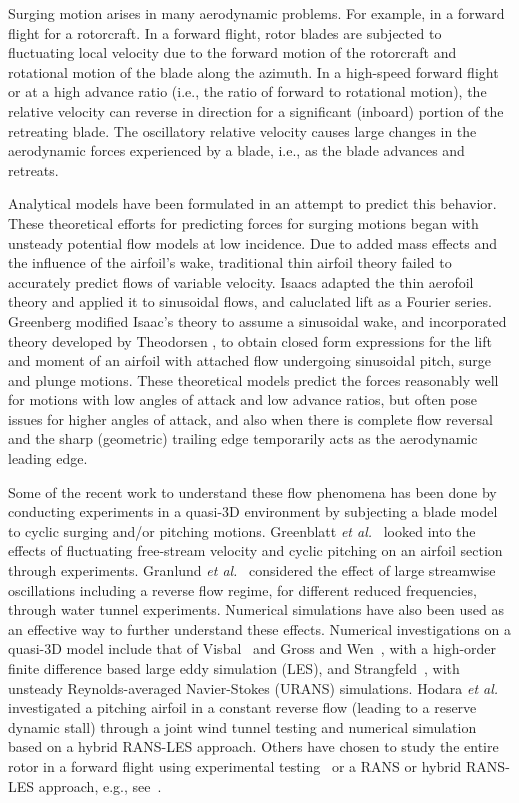 Surging motion arises in many aerodynamic problems.
For example, in a forward flight for a rotorcraft.
In a forward flight, rotor blades are subjected to fluctuating local velocity due to the forward motion of the rotorcraft 
and rotational motion of the blade along the azimuth. 
In a high-speed forward flight or at a high advance ratio (i.e., the ratio of forward to rotational motion), the relative velocity 
can reverse in direction for a significant (inboard) portion of the retreating blade.
The oscillatory relative velocity causes large changes in the aerodynamic forces experienced by a blade, i.e., as the blade advances and retreats. 

Analytical models have been formulated in an attempt to predict this behavior. These theoretical efforts for predicting forces for surging motions began with unsteady potential flow models at low incidence. 
Due to added mass effects and the influence of the airfoil’s wake, traditional thin airfoil theory failed to accurately predict flows of variable velocity. 
Isaacs \cite{bib:Isaacs} adapted the thin aerofoil theory and applied it to sinusoidal flows, and caluclated lift as a Fourier series.
Greenberg \cite{bib:Greenberg1947} modified Isaac's theory to assume a sinusoidal wake, and incorporated theory developed by Theodorsen \cite{bib:Theodorsen1934}, to obtain closed form expressions for the lift and moment of an airfoil with attached flow undergoing sinusoidal pitch, surge and plunge motions. 
These theoretical models predict the forces reasonably well \cite{bib:greenblatt2016} for motions with low angles of attack and low advance ratios, but often pose issues for higher angles of attack, and also when there is complete flow reversal and the sharp (geometric) trailing edge temporarily acts as the aerodynamic leading edge.

Some of the recent work to understand these flow phenomena has been done by conducting experiments in a quasi-3D environment by subjecting a blade model to cyclic surging and/or pitching motions.
Greenblatt \textit{et al.}~\cite{bib:greenblatt2016} looked into the effects of fluctuating free-stream velocity and cyclic pitching on an airfoil section through experiments.
Granlund \textit{et al.}~\cite{bib:granlund2016} considered the effect of large streamwise oscillations including a reverse flow regime, for different reduced frequencies, through water tunnel experiments.
Numerical simulations have also been used as an effective way to further understand these effects.
Numerical investigations on a quasi-3D model include that of Visbal~\cite{bib:visbal2014} and Gross and Wen~\cite{bib:gross2016}, with a high-order finite difference based large eddy simulation (LES), and Strangfeld~\cite{bib:stangfeld2015unsteady}, with unsteady Reynolds-averaged Navier-Stokes (URANS) simulations.
Hodara \textit{et al.}~\cite{bib:hodara2016} investigated a pitching airfoil in a constant reverse flow (leading to a reserve dynamic stall) through a joint wind tunnel testing and numerical simulation based on a hybrid RANS-LES approach.
Others have chosen to study the entire rotor in a forward flight using experimental testing~\cite{bib:norman2011} or a RANS or hybrid RANS-LES approach, e.g., see~\cite{bib:chaderjian2012detached,bib:potsdam2016}.

